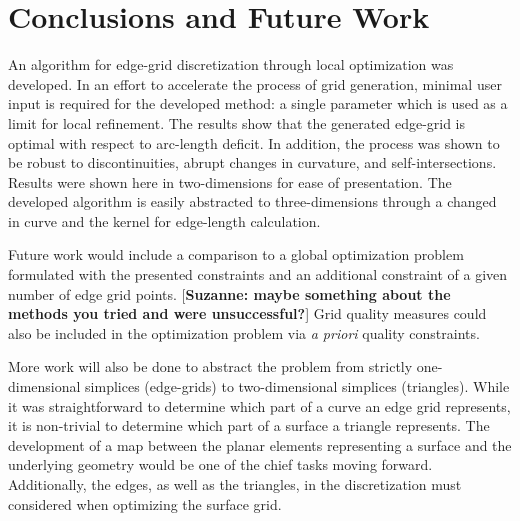 \section{Conclusions and Future Work}
An algorithm for edge-grid discretization through local optimization was developed. In an effort to accelerate the process of grid generation, minimal user input is required for the developed method: a single parameter which is used as a limit for local refinement. The results show that the generated edge-grid is optimal with respect to arc-length deficit. In addition, the process was shown to be robust to discontinuities, abrupt changes in curvature, and self-intersections. Results were shown here in two-dimensions for ease of presentation. The developed algorithm is easily abstracted to three-dimensions through a changed in curve and the kernel for edge-length calculation.

Future work would include a comparison to a global optimization problem formulated with the presented constraints and an additional constraint of a given number of edge grid points. [{\bf Suzanne: maybe something about the methods you tried and were unsuccessful?}] Grid quality measures could also be included in the optimization problem via {\it a priori} quality constraints.

More work will also be done to abstract the problem from strictly one-dimensional simplices (edge-grids) to two-dimensional simplices (triangles). While it was straightforward to determine which part of a curve an edge grid represents, it is non-trivial to determine which part of a surface a triangle represents. The development of a map between the planar elements representing a surface and the underlying geometry would be one of the chief tasks moving forward. Additionally, the edges, as well as the triangles, in the discretization must considered when optimizing the surface grid.
